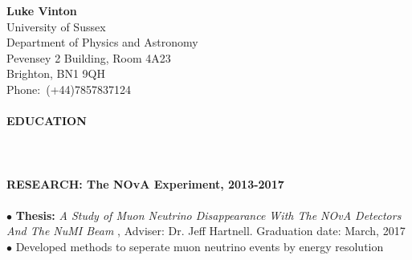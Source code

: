 \documentclass[10pt]{article} %
\begin{document}

{\bf \noindent Luke Vinton } \\
University of Sussex\\
Department of Physics and Astronomy \\
Pevensey 2 Building, Room 4A23 \\
Brighton, BN1 9QH \\
Phone:~(+44)7857837124 \\
%
%
\medskip \\
{\bf EDUCATION ~~\hrulefill}
\medskip \\
 \\%
 \\%
%
%
\medskip \\
{\bf RESEARCH: The NOvA Experiment, 2013-2017~~\hrulefill}
\medskip \\
\\
%
$\bullet$ {\bf Thesis:} {\it A Study of Muon Neutrino Disappearance
  With The NOvA Detectors And The NuMI Beam },
Adviser: Dr. Jeff Hartnell. Graduation date: March, 2017
\\
%
$\bullet$ Developed methods to seperate muon neutrino events by energy resolution
\\
\end{document}
